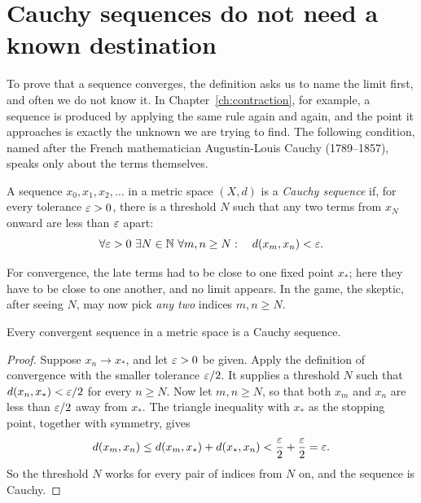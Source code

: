 \section{Cauchy sequences do not need a known destination}\label{ch11:sec:cauchy}
To prove that a sequence converges, the definition asks us to name the limit first, and often we do not know it. In Chapter~\ref{ch:contraction}, for example, a sequence is produced by applying the same rule again and again, and the point it approaches is exactly the unknown we are trying to find. The following condition, named after the French mathematician Augustin-Louis Cauchy (1789--1857), speaks only about the terms themselves.
\par\noindent\begin{minipage}{\linewidth}
\begin{definition}\label{ch11:def:cauchy}
A sequence $x_0,x_1,x_2,\ldots$ in a metric space $(X,d)$ is a \emph{Cauchy sequence} if, for every tolerance $\varepsilon>0$, there is a threshold $N$ such that any two terms from $x_N$ onward are less than $\varepsilon$ apart:
\[
\forall\varepsilon>0\ \exists N\in\mathbb N\ \forall m,n\ge N:\quad d(x_m,x_n)<\varepsilon.
\]
\end{definition}
\end{minipage}\par

For convergence, the late terms had to be close to one fixed point $x_*$; here they have to be close to one another, and no limit appears. In the game, the skeptic, after seeing $N$, may now pick \emph{any two} indices $m,n\ge N$.

\par\noindent\begin{minipage}{\linewidth}
\begin{proposition}\label{ch11:prop:convergent-cauchy}
Every convergent sequence in a metric space is a Cauchy sequence.
\end{proposition}
\end{minipage}\par

\begin{proof}
Suppose $x_n\to x_*$, and let $\varepsilon>0$ be given. Apply the definition of convergence with the smaller tolerance $\varepsilon/2$. It supplies a threshold $N$ such that $d(x_n,x_*)<\varepsilon/2$ for every $n\ge N$. Now let $m,n\ge N$, so that both $x_m$ and $x_n$ are less than $\varepsilon/2$ away from $x_*$. The triangle inequality with $x_*$ as the stopping point, together with symmetry, gives
\[
 d(x_m,x_n)\le d(x_m,x_*)+d(x_*,x_n)
 <\frac{\varepsilon}2+\frac{\varepsilon}2=\varepsilon.
\]
So the threshold $N$ works for every pair of indices from $N$ on, and the sequence is Cauchy.
\end{proof}

